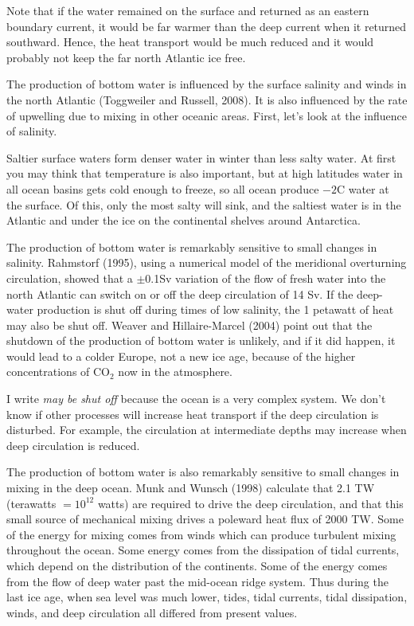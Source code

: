 Note that if the water remained on the surface and returned as an
eastern boundary current, it would be far warmer than the deep current
when it returned southward. Hence, the heat
transport would be much reduced and it would
probably not keep the far north Atlantic ice free.

The production of bottom water is influenced by
the surface salinity and winds in the north Atlantic (Toggweiler and
Russell, 2008). It is also influenced by the rate of
upwelling due to mixing
in other oceanic areas. First, let's look at the influence of
salinity.

Saltier surface waters form denser water in winter than less salty
water. At first you may think that temperature is also important, but
at high latitudes water in all ocean basins gets cold enough to
freeze, so all ocean produce $-2$\degrees C water at the surface. Of
this, only the most salty will sink, and the saltiest water is in the
Atlantic and under the ice on the continental shelves around
Antarctica.

The production of bottom water is remarkably sensitive to small
changes in salinity. Rahmstorf (1995), using a numerical model of the
meridional over\-turning circulation, showed that a $\pm$0.1Sv variation of the flow of
fresh water into the north Atlantic can switch on or off the deep
circulation of 14 Sv. If the deep-water production is shut off during
times of low salinity, the 1 petawatt of heat may also be shut
off. Weaver and Hillaire-Marcel (2004) point out that the shutdown of
the production of bottom water is unlikely, and if it did happen, it
would lead to a colder Europe, not a new ice age, because of the
higher concentrations of CO$_2$ now in the atmosphere.

I write \textit{may be shut off} because the ocean is a very complex
system. We don't know if other processes will increase heat
transport if the deep circulation is
disturbed. For example, the circulation at intermediate depths may
increase when deep circulation is reduced.

The production of bottom water is also remarkably sensitive to small
changes in mixing in the deep ocean. Munk
and Wunsch (1998) calculate that 2.1 TW (terawatts $= 10^{12}$ watts)
are required to drive the deep circulation, and that this small source
of mechanical mixing drives a
poleward heat flux of 2000 TW. Some of the
energy for mixing comes from winds which can
produce turbulent mixing throughout the
ocean. Some energy comes from the dissipation of tidal
currents, which depend on the distribution of the
continents. Some of the energy comes from the flow of deep water past
the mid-ocean ridge system. Thus during the last ice age, when sea
level was much lower, tides, tidal currents, tidal dissipation, winds,
and deep circulation all differed from present values.

